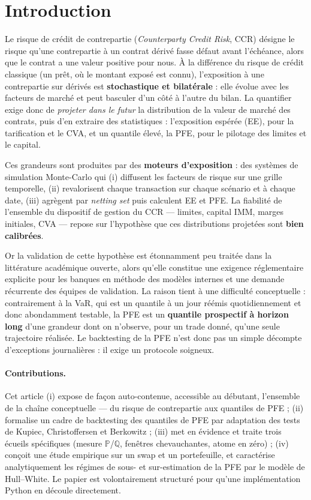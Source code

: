 \documentclass[11pt,a4paper]{article}
\newcommand{\Prob}{\mathbb{P}}
\newcommand{\Qmeas}{\mathbb{Q}}
\theoremstyle{remark}
\begin{document}
\section{Introduction}

Le risque de crédit de contrepartie (\emph{Counterparty Credit Risk}, CCR) désigne le risque qu'une contrepartie à un contrat dérivé fasse défaut avant l'échéance, alors que le contrat a une valeur positive pour nous. À la différence du risque de crédit classique (un prêt, où le montant exposé est connu), l'exposition à une contrepartie sur dérivés est \textbf{stochastique et bilatérale} : elle évolue avec les facteurs de marché et peut basculer d'un côté à l'autre du bilan. La quantifier exige donc de \emph{projeter dans le futur} la distribution de la valeur de marché des contrats, puis d'en extraire des statistiques : l'exposition espérée (EE), pour la tarification et le CVA, et un quantile élevé, la PFE, pour le pilotage des limites et le capital.

Ces grandeurs sont produites par des \textbf{moteurs d'exposition} : des systèmes de simulation Monte-Carlo qui (i) diffusent les facteurs de risque sur une grille temporelle, (ii) revalorisent chaque transaction sur chaque scénario et à chaque date, (iii) agrègent par \emph{netting set} puis calculent EE et PFE. La fiabilité de l'ensemble du dispositif de gestion du CCR --- limites, capital IMM, marges initiales, CVA --- repose sur l'hypothèse que ces distributions projetées sont \textbf{bien calibrées}.

Or la validation de cette hypothèse est étonnamment peu traitée dans la littérature académique ouverte, alors qu'elle constitue une exigence réglementaire explicite pour les banques en méthode des modèles internes et une demande récurrente des équipes de validation. La raison tient à une difficulté conceptuelle : contrairement à la VaR, qui est un quantile à un jour réémis quotidiennement et donc abondamment testable, la PFE est un \textbf{quantile prospectif à horizon long} d'une grandeur dont on n'observe, pour un trade donné, qu'une seule trajectoire réalisée. Le backtesting de la PFE n'est donc pas un simple décompte d'exceptions journalières : il exige un protocole soigneux.

\paragraph{Contributions.} Cet article (i) expose de façon auto-contenue, accessible au débutant, l'ensemble de la chaîne conceptuelle --- du risque de contrepartie aux quantiles de PFE ; (ii) formalise un cadre de backtesting des quantiles de PFE par adaptation des tests de Kupiec, Christoffersen et Berkowitz ; (iii) met en évidence et traite trois écueils spécifiques (mesure $\Prob$/$\Qmeas$, fenêtres chevauchantes, atome en zéro) ; (iv) conçoit une étude empirique sur un swap et un portefeuille, et caractérise analytiquement les régimes de sous- et sur-estimation de la PFE par le modèle de Hull--White. Le papier est volontairement structuré pour qu'une implémentation Python en découle directement.
\end{document}
